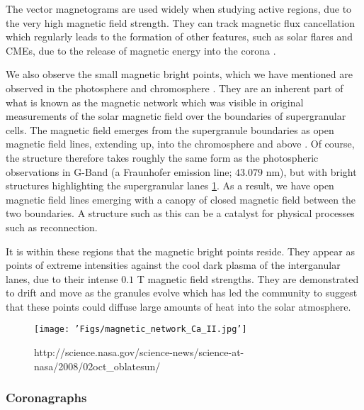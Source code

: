 The vector magnetograms are used widely when studying active regions, due to the very high magnetic field strength.
They can track magnetic flux cancellation which regularly leads to the formation of other features, such as solar flares and CMEs, due to the release of magnetic energy into the corona \cite{Welsch2006}.

We also observe the small magnetic bright points, which we have mentioned are observed in the photosphere and chromosphere \cite{SanchesAlmeida2010}.
They are an inherent part of what is known as the magnetic network which was visible in original measurements of the solar magnetic field over the boundaries of supergranular cells.
The magnetic field emerges from the supergranule boundaries as open magnetic field lines, extending up, into the chromosphere and above \citep{Hasan2005}.
Of course, the structure therefore takes roughly the same form as the photospheric observations in G-Band (a Fraunhofer emission line; $43.079$ nm), but with bright structures highlighting the supergranular lanes \ref{fig:mag_network}.
As a result, we have open magnetic field lines emerging with a canopy of closed magnetic field between the two boundaries.
A structure such as this can be a catalyst for physical processes such as reconnection.

It is within these regions that the magnetic bright points reside.
They appear as points of extreme intensities against the cool dark plasma of the interganular lanes, due to their intense $0.1$ T magnetic field strengths.
They are demonstrated to drift and move as the granules evolve \citep{Chitta2012} which has led the community to suggest that these points could diffuse large amounts of heat into the solar atmosphere.

\begin{figure}
	\texttt{[image: 'Figs/magnetic\_network\_Ca\_II.jpg']}
	\caption{http://science.nasa.gov/science-news/science-at-nasa/2008/02oct_oblatesun/}
	\label{fig:mag_network}
\end{figure}


\subsubsection{Coronagraphs}

